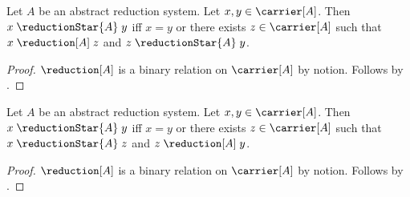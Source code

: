 \begin{theorem}\label{reduction_star_first_step}
    Let $A$ be an abstract reduction system.
    Let $x,y\in\carrier[A]$.
    Then $x\mathrel{\reductionStar{A}}y$ iff
        $x=y$ or there exists $z\in\carrier[A]$ such that
            $x\mathrel{\reduction[A]}z$ and
            $z\mathrel{\reductionStar{A}}y$.
\end{theorem}
\begin{proof}
    $\reduction[A]$ is a binary relation on $\carrier[A]$ by notion.
    Follows by .
\end{proof}

\begin{theorem}\label{reduction_star_last_step}
    Let $A$ be an abstract reduction system.
    Let $x,y\in\carrier[A]$.
    Then $x\mathrel{\reductionStar{A}}y$ iff
        $x=y$ or there exists $z\in\carrier[A]$ such that
            $x\mathrel{\reductionStar{A}}z$ and
            $z\mathrel{\reduction[A]}y$.
\end{theorem}
\begin{proof}
    $\reduction[A]$ is a binary relation on $\carrier[A]$ by notion.
    Follows by .
\end{proof}
